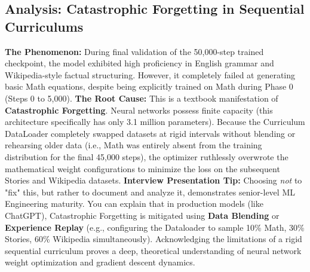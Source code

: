 \documentclass[12pt, a4paper]{article}
\begin{document}
\subsection{Analysis: Catastrophic Forgetting in Sequential Curriculums}
\textbf{The Phenomenon:} During final validation of the 50,000-step trained checkpoint, the model exhibited high proficiency in English grammar and Wikipedia-style factual structuring. However, it completely failed at generating basic Math equations, despite being explicitly trained on Math during Phase 0 (Steps 0 to 5,000). 
\newline\newline
\textbf{The Root Cause:} This is a textbook manifestation of \textbf{Catastrophic Forgetting}. Neural networks possess finite capacity (this architecture specifically has only 3.1 million parameters). Because the Curriculum DataLoader completely swapped datasets at rigid intervals without blending or rehearsing older data (i.e., Math was entirely absent from the training distribution for the final 45,000 steps), the optimizer ruthlessly overwrote the mathematical weight configurations to minimize the loss on the subsequent Stories and Wikipedia datasets. 
\newline\newline
\textbf{Interview Presentation Tip:} Choosing \textit{not} to "fix" this, but rather to document and analyze it, demonstrates senior-level ML Engineering maturity. You can explain that in production models (like ChatGPT), Catastrophic Forgetting is mitigated using \textbf{Data Blending} or \textbf{Experience Replay} (e.g., configuring the Dataloader to sample 10\% Math, 30\% Stories, 60\% Wikipedia simultaneously). Acknowledging the limitations of a rigid sequential curriculum proves a deep, theoretical understanding of neural network weight optimization and gradient descent dynamics.
\end{document}
